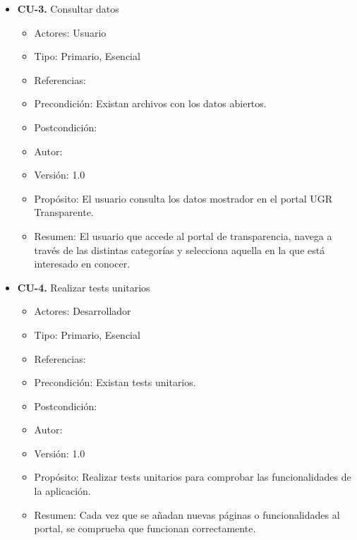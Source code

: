 \begin{itemize}
 
  \item \textbf{CU-3.} Consultar datos
  \begin{itemize}
    \item Actores: Usuario
    \item Tipo: Primario, Esencial
    \item Referencias:
    \item Precondición: Existan archivos con los datos abiertos.
    \item Postcondición:
    \item Autor: \autor
    \item Versión: 1.0
    \item Propósito: El usuario consulta los datos mostrador en el portal UGR Transparente.
    \item Resumen: El usuario que accede al portal de transparencia, navega a través de las distintas categorías y selecciona
    aquella en la que está interesado en conocer.
  \end{itemize}
 
  \item \textbf{CU-4.} Realizar tests unitarios
  \begin{itemize}
    \item Actores: Desarrollador
    \item Tipo: Primario, Esencial
    \item Referencias:
    \item Precondición: Existan tests unitarios.
    \item Postcondición: 
    \item Autor: \autor
    \item Versión: 1.0
    \item Propósito: Realizar tests unitarios para comprobar las funcionalidades de la aplicación.
    \item Resumen: Cada vez que se añadan nuevas páginas o funcionalidades al portal, se comprueba que funcionan correctamente.
  \end{itemize}
 

\end{itemize}
